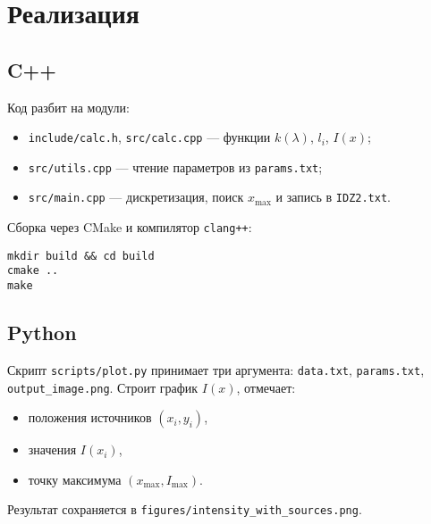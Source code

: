 \section{Реализация}
\subsection{C++}
Код разбит на модули:
\begin{itemize}
  \item \texttt{include/calc.h}, \texttt{src/calc.cpp} — функции $k(\lambda)$, $l_i$, $I(x)$;
  \item \texttt{src/utils.cpp} — чтение параметров из \texttt{params.txt};
  \item \texttt{src/main.cpp} — дискретизация, поиск $x_{\max}$ и запись в \texttt{IDZ2.txt}.
\end{itemize}
Сборка через CMake и компилятор \texttt{clang++}:
\begin{verbatim}
mkdir build && cd build
cmake ..
make
\end{verbatim}

\subsection{Python}
Скрипт \texttt{scripts/plot.py} принимает три аргумента:
\texttt{data.txt}, \texttt{params.txt}, \texttt{output\_image.png}.
Строит график $I(x)$, отмечает:
\begin{itemize}
  \item положения источников $(x_i,y_i)$,
  \item значения $I(x_i)$,
  \item точку максимума $(x_{\max},I_{\max})$.
\end{itemize}
Результат сохраняется в \texttt{figures/intensity\_with\_sources.png}.
